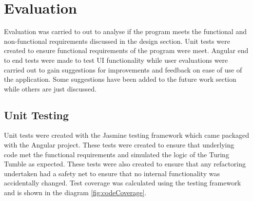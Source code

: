 \documentclass{l4proj}
\begin{document}


\chapter{Evaluation}

Evaluation was carried to out to analyse if the program meets the functional and non-functional requirements discussed in the design section. Unit tests were created to ensure functional requirements of the program were meet. Angular end to end tests were made to test UI functionality while user evaluations were carried out to gain suggestions for improvements and feedback on ease of use of the application. Some suggestions have been added to the future work section while others are just discussed. 

\section{Unit Testing}
Unit tests were created with the Jasmine testing framework which came packaged with the Angular project. These tests were created to ensure that underlying code met the functional requirements and simulated the logic of the Turing Tumble as expected. These tests were also created to ensure that any refactoring undertaken had a safety net to ensure that no internal functionality was accidentally changed. Test coverage was calculated using the testing framework and is shown in the diagram \ref{fig:codeCoverage}. 
\end{document}
